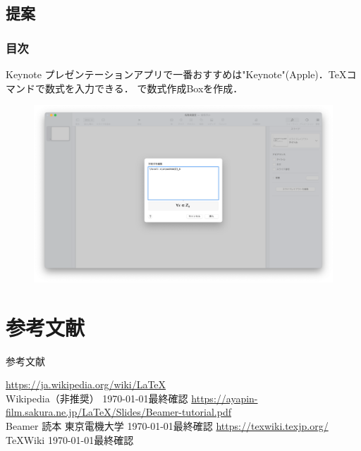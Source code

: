 \documentclass[dvipdfmx]{beamer}
\begin{document}
\subsection{提案}
\begin{frame}
    \frametitle{目次}
    \tableofcontents[currentsection,sectionstyle=show/shaded,subsectionstyle=show/shaded]
\end{frame}
\begin{frame}[fragile]{Keynote}
    プレゼンテーションアプリで一番おすすめは"Keynote"(Apple)．\TeX コマンドで数式を入力できる．
    で数式作成Boxを作成．
    \begin{figure}[h]
        \centering
        \includegraphics[scale = 0.2]{fig2.png}
    \end{figure}
\end{frame}


\section{参考文献}
\begin{frame}{参考文献}
    \begin{thebibliography}{99}
         \url{https://ja.wikipedia.org/wiki/LaTeX}\\
        \hspace{3em}Wikipedia（非推奨） \today 最終確認
         \url{https://ayapin-film.sakura.ne.jp/LaTeX/Slides/Beamer-tutorial.pdf}\\
        \hspace{3em}Beamer 読本 東京電機大学 \today 最終確認
         \url{https://texwiki.texjp.org/}\\
        \hspace{3em}\TeX Wiki \today 最終確認
    \end{thebibliography}
\end{frame}
\end{document}
